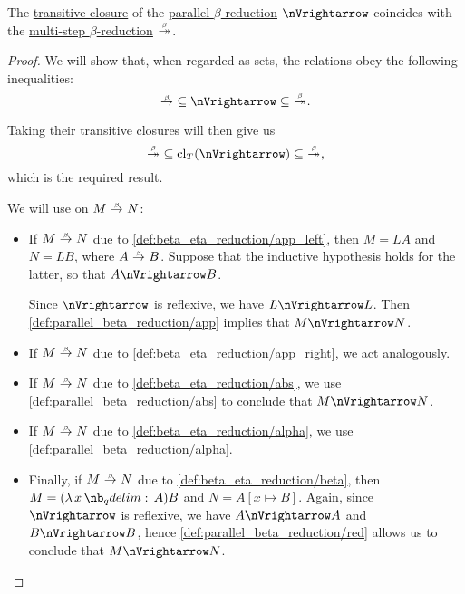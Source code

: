 \begin{proposition}\label{thm:parallel_beta_reduction_transitive_closure}
  The \hyperref[def:relation_closures/transitive]{transitive closure} of the \hyperref[def:parallel_beta_reduction]{parallel \( \beta \)-reduction} \( {\pred} \) coincides with the \hyperref[def:beta_eta_reduction/reduction]{multi-step \( \beta \)-reduction} \( {\bred*} \).
\end{proposition}
\begin{proof}
  We will show that, when regarded as sets, the relations obey the following inequalities:
  \begin{equation*}
    {\bred} \subseteq {\pred} \subseteq {\bred*}.
  \end{equation*}

  Taking their transitive closures will then give us
  \begin{equation*}
    {\bred*} \subseteq \cl_T({\pred}) \subseteq {\bred*},
  \end{equation*}
  which is the required result.

   We will use  on \( M \bred N \):
  \begin{itemize}
    \item If \( M \bred N \) due to \ref{def:beta_eta_reduction/app_left}, then \( M = LA \) and \( N = LB \), where \( A \bred B \). Suppose that the inductive hypothesis holds for the latter, so that \( A \pred B \).

    Since \( {\pred} \) is reflexive, we have \( L \pred L \). Then \ref{def:parallel_beta_reduction/app} implies that \( M \pred N \).

    \item If \( M \bred N \) due to \ref{def:beta_eta_reduction/app_right}, we act analogously.

    \item If \( M \bred N \) due to \ref{def:beta_eta_reduction/abs}, we use \ref{def:parallel_beta_reduction/abs} to conclude that \( M \pred N \).

    \item If \( M \bred N \) due to \ref{def:beta_eta_reduction/alpha}, we use \ref{def:parallel_beta_reduction/alpha}.

    \item Finally, if \( M \bred N \) due to \ref{def:beta_eta_reduction/beta}, then \( M = (\qabs x A) B \) and \( N = A[x \mapsto B] \). Again, since \( {\pred} \) is reflexive, we have \( A \pred A \) and \( B \pred B \), hence \ref{def:parallel_beta_reduction/red} allows us to conclude that \( M \pred N \).
  \end{itemize}


\end{proof}
